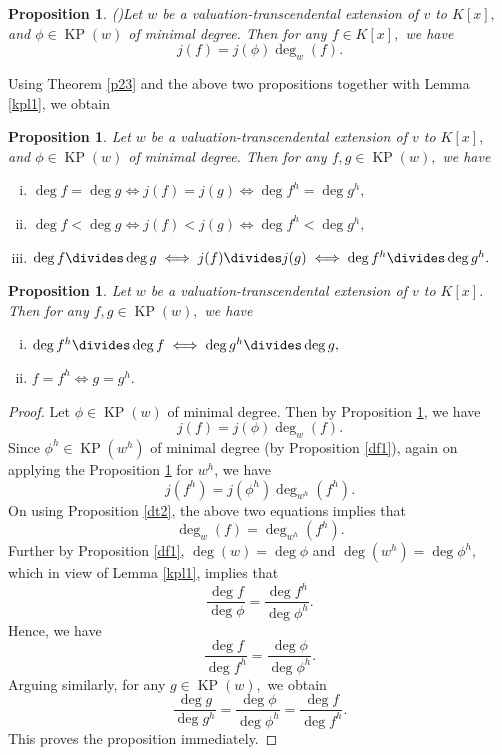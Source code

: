 \documentclass[11pt]{amsart}
\newtheorem{proposition}[theorem]{Proposition}
\theoremstyle{definition}
\theoremstyle{remark}
\numberwithin{equation}{section}
\begin{document}
\begin{proposition}(\cite[Proposition 3.5]{AD2})\label{dp1}
	Let $w$ be a valuation-transcendental extension of $v$ to $K[x],$ and $\phi\in \operatorname{KP}(w)$ of minimal degree.  Then for any $f\in K[x],$ we have
	\[j(f)=j(\phi)\deg_w(f).\]
\end{proposition}
Using Theorem \ref{p23} and the above two propositions together with Lemma \ref{kpl1}, we obtain 
\begin{proposition}
Let $w$ be a valuation-transcendental extension of $v$ to $K[x],$ and $\phi\in \operatorname{KP}(w)$	of minimal degree. Then for any $f, g\in \operatorname{KP}(w),$ we have \begin{enumerate}[(i)]
	\item $\deg f=\deg g\iff j(f)=j(g)\iff \deg f^h=\deg g^h,$
		\item $\deg f<\deg g\iff j(f)<j(g)\iff \deg f^h<\deg g^h,$
			\item $\deg f\divides\deg g\iff j(f)\divides j(g)\iff \deg f^h\divides\deg g^h.$
\end{enumerate}
\end{proposition}
\begin{proposition}\label{bp3}
	Let $w$ be a valuation-transcendental extension of $v$ to $K[x].$ Then for any $f, g\in \operatorname{KP}(w),$ we have \begin{enumerate}[(i)]
		\item $\deg f^h\divides \deg f \iff \deg g^h\divides \deg g,$
		\item $f=f^h \iff g=g^h.$
	\end{enumerate}
\end{proposition}
\begin{proof}
	Let $\phi\in\operatorname{KP}(w)$ of minimal degree. Then by Proposition \ref{dp1}, we have \[j(f)=j(\phi)\deg_w(f).\] Since $\phi^h\in \operatorname{KP}(w^h) $ of minimal degree (by Proposition \ref{df1}), again on applying the Proposition \ref{dp1} for $w^h$, we have \[j(f^h)=j(\phi^h)\deg_{w^h}(f^h).\] On using Proposition \ref{dt2}, the above two equations implies that\[\deg_w(f)=\deg_{w^h}(f^h).\] Further by Proposition \ref{df1},  $\deg (w)=\deg\phi$ and $\deg (w^h)=\deg\phi^h,$ which in view of Lemma \ref{kpl1}, implies that
	\[\frac{\deg f}{\deg \phi}=\frac{\deg f^h}{\deg \phi^h}.\] Hence, we have 
	\[\frac{\deg f}{\deg f^h}=\frac{\deg \phi}{\deg \phi^h}.\]Arguing similarly, for any $g \in \operatorname{KP}(w),$ we obtain	\[\frac{\deg g }{\deg g^h}=\frac{\deg \phi}{\deg \phi^h}=\frac{\deg f}{\deg f^h}.\] This proves the proposition immediately.
\end{proof}
\end{document}
